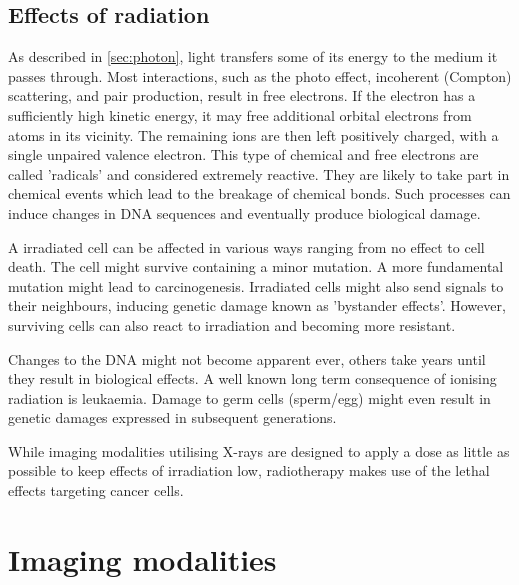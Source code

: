 \subsection{Effects of radiation}
\label{sec:irradiate}

As described in \ref{sec:photon}, light transfers some of its energy to the medium it passes through.
Most interactions, such as the photo effect, incoherent (Compton) scattering, and pair production, result in free electrons.
If the electron has a sufficiently high kinetic energy, it may free additional orbital electrons from atoms in its vicinity.
The remaining ions are then left positively charged, with a single unpaired valence electron.
This type of chemical and free electrons are called 'radicals' and considered extremely reactive.
They are likely to take part in chemical events which lead to the breakage of chemical bonds.
Such processes can induce changes in DNA sequences and eventually produce biological damage.

A irradiated cell can be affected in various ways ranging from no effect to cell death.
The cell might survive containing a minor mutation.
A more fundamental mutation might lead to carcinogenesis.
Irradiated cells might also send signals to their neighbours, inducing genetic damage known as 'bystander effects'.
However, surviving cells can also react to irradiation and becoming more resistant.

Changes to the DNA might not become apparent ever, others take years until they result in biological effects.
A well known long term consequence of ionising radiation is leukaemia.
Damage to germ cells (sperm/egg) might even result in genetic damages expressed in subsequent generations.

While imaging modalities utilising X-rays are designed to apply a dose as little as possible to keep effects of irradiation low, radiotherapy makes use of the lethal effects targeting cancer cells. \cite{Podgorsak, Maidment2014}

\section{Imaging modalities}
